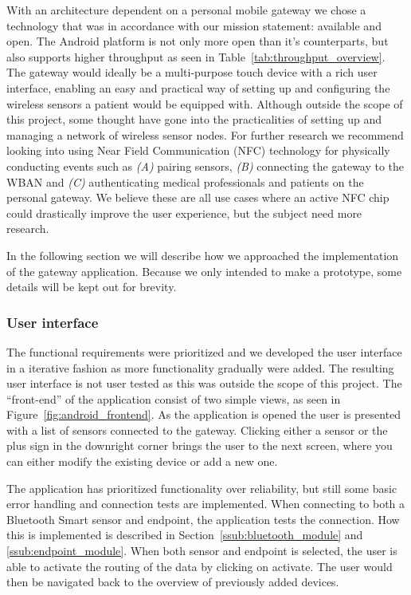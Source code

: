 With an architecture dependent on a personal mobile gateway we chose a technology that was in accordance with our mission statement: available and open. The Android platform is not only more open than it's counterparts, but also supports higher throughput as seen in Table~\ref{tab:throughput_overview}.
The gateway would ideally be a multi-purpose touch device with a rich user interface, enabling an easy and practical way of setting up and configuring the wireless sensors a patient would be equipped with. Although outside the scope of this project, some thought have gone into the practicalities of setting up and managing a network of wireless sensor nodes. For further research we recommend looking into using Near Field Communication (NFC) technology for physically conducting events such as \emph{(A)} pairing sensors, \emph{(B)} connecting the gateway to the WBAN and \emph{(C)} authenticating medical professionals and patients on the personal gateway. We believe these are all use cases where an active NFC chip could drastically improve the user experience, but the subject need more research.

In the following section we will describe how we approached the implementation of the gateway application. Because we only intended to make a prototype, some details will be kept out for brevity. 

\subsubsection{User interface} %
\label{ssub:the_user_interface}

The functional requirements were prioritized and we developed the user interface in a iterative fashion as more functionality gradually were added. The resulting user interface is not user tested as this was outside the scope of this project. The ``front-end'' of the application consist of two simple views, as seen in Figure~\ref{fig:android_frontend}. As the application is opened the user is presented with a list of sensors connected to the gateway. Clicking either a sensor or the plus sign in the downright corner brings the user to the next screen, where you can either modify the existing device or add a new one. 

The application has prioritized functionality over reliability, but still some basic error handling and connection tests are implemented. When connecting to both a Bluetooth Smart sensor and endpoint, the application tests the connection. How this is implemented is described in Section~\ref{ssub:bluetooth_module} and \ref{ssub:endpoint_module}. When both sensor and endpoint is selected, the user is able to activate the routing of the data by clicking on activate. The user would then be navigated back to the overview of previously added devices.

